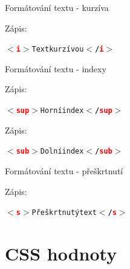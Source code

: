 \documentclass[aspectratio=1610]{beamer}
\begin{document}
\begin{frame}{Formátování textu - kurzíva}
    \begin{cardTiny}
        \begin{flushleft}
            Zápis: \begin{alltt}\textbf{$<$\textcolor{red}{i}$>$}Text kurzívou\textbf{$<$/\textcolor{red}{i}$>$}\end{alltt}
        \end{flushleft}
    \end{cardTiny}
\end{frame}

\begin{frame}{Formátování textu - indexy}
    \begin{cardTiny}
        \begin{flushleft}
            Zápis: \begin{alltt}\textbf{$<$\textcolor{red}{sup}$>$}Horní index\textbf{$<$/\textcolor{red}{sup}$>$}\end{alltt}
        \end{flushleft}
    \end{cardTiny}
    \begin{cardTiny}
        \begin{flushleft}
            Zápis: \begin{alltt}\textbf{$<$\textcolor{red}{sub}$>$}Dolní index\textbf{$<$/\textcolor{red}{sub}$>$}\end{alltt}
        \end{flushleft}
    \end{cardTiny}
\end{frame}

\begin{frame}{Formátování textu - přeškrtnutí}
    \begin{cardTiny}
        \begin{flushleft}
            Zápis: \begin{alltt}\textbf{$<$\textcolor{red}{s}$>$}Přeškrtnutý text\textbf{$<$/\textcolor{red}{s}$>$}\end{alltt}
        \end{flushleft}
    \end{cardTiny}
\end{frame}



\section{CSS hodnoty}
\end{document}
